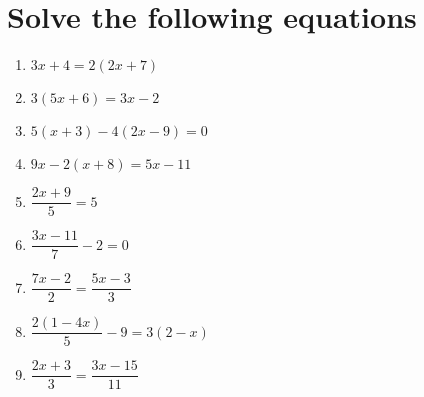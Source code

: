 \documentclass[12pt,letterpaper]{article}
\begin{document}
\section*{Solve the following equations}
\begin{large}
\begin{enumerate}
\item \quad $3x + 4 = 2(2x + 7)$

\addvspace{0.6in}

\item \quad $3(5x + 6) = 3x - 2$

\addvspace{0.6in}

\item \quad $5(x + 3) - 4(2x - 9) = 0$

\addvspace{0.6in}

\item \quad $9x - 2(x + 8) = 5x - 11$

\addvspace{0.6in}

\item \quad $\dfrac{2x + 9}{5} = 5$

\addvspace{0.6in}

\item \quad $\dfrac{3x - 11}{7} - 2 = 0$

\addvspace{0.6in}

\item \quad $\dfrac{7x - 2}{2} = \dfrac{5x - 3}{3}$

\addvspace{0.6in}

\item \quad $\dfrac{2(1 - 4x)}{5} - 9 = 3(2 - x)$

\addvspace{0.6in}

\item \quad $\dfrac{2x + 3}{3} = \dfrac{3x - 15}{11}$

\addvspace{0.6in}

\end{enumerate}
\end{large}
\end{document}
